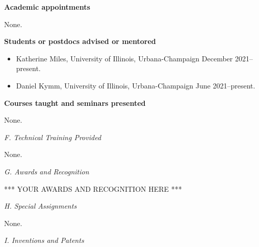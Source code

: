 \documentclass[12pt]{article}
\begin{document}
\vspace{10pt}
\raggedright \textbf{Academic appointments} \\
\vspace{10pt}

None.

\vspace{10pt}
\raggedright \textbf{Students or postdocs advised or mentored} \\
\vspace{10pt}

\begin{itemize}
\item Katherine Miles,
  University of Illinois, Urbana-Champaign
  December 2021--present.
\item Daniel Kymm,
  University of Illinois, Urbana-Champaign
  June 2021--present.
\end{itemize}

\vspace{10pt}
\raggedright \textbf{Courses taught and seminars presented} \\
\vspace{10pt}

None.


\vspace{10pt}
\raggedright \large \textit{F. Technical Training Provided} \\
\normalsize
\vspace{10pt}

None.

\vspace{10pt}
\raggedright \large \textit{G. Awards and Recognition} \\
\normalsize
\vspace{10pt}





*** YOUR AWARDS AND RECOGNITION HERE ***





\vspace{10pt}
\raggedright \large \textit{H. Special Assignments} \\
\normalsize
\vspace{10pt}

None.

\vspace{10pt}
\raggedright \large \textit{I. Inventions and Patents} \\
\normalsize
\vspace{10pt}
\end{document}
